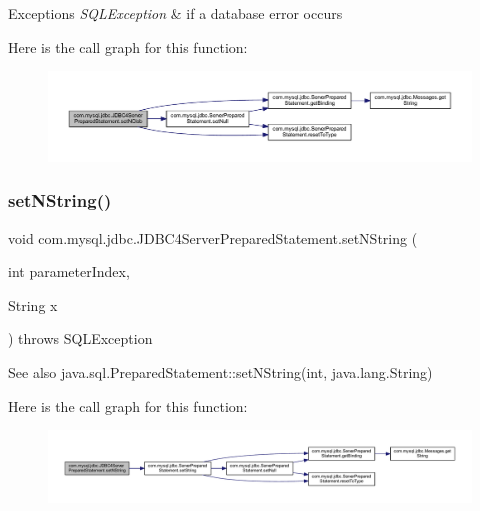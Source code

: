 \begin{DoxyExceptions}{Exceptions}
{\em S\+Q\+L\+Exception} & if a database error occurs \\
\hline
\end{DoxyExceptions}
Here is the call graph for this function\+:
\nopagebreak
\begin{figure}[H]
\begin{center}
\leavevmode
\includegraphics[width=350pt]{classcom_1_1mysql_1_1jdbc_1_1_j_d_b_c4_server_prepared_statement_ac23ffa64369e7e5739c4f6c4ad1d0603_cgraph}
\end{center}
\end{figure}
\mbox{\label{classcom_1_1mysql_1_1jdbc_1_1_j_d_b_c4_server_prepared_statement_ae84254367761392e3c048bb7101d1074}} 
\subsubsection{\texorpdfstring{set\+N\+String()}{setNString()}}
{\footnotesize\ttfamily void com.\+mysql.\+jdbc.\+J\+D\+B\+C4\+Server\+Prepared\+Statement.\+set\+N\+String (\begin{DoxyParamCaption}\item[{int}]{parameter\+Index,  }\item[{String}]{x }\end{DoxyParamCaption}) throws S\+Q\+L\+Exception}

\begin{DoxySeeAlso}{See also}
java.\+sql.\+Prepared\+Statement\+::set\+N\+String(int, java.\+lang.\+String) 
\end{DoxySeeAlso}
Here is the call graph for this function\+:
\nopagebreak
\begin{figure}[H]
\begin{center}
\leavevmode
\includegraphics[width=350pt]{classcom_1_1mysql_1_1jdbc_1_1_j_d_b_c4_server_prepared_statement_ae84254367761392e3c048bb7101d1074_cgraph}
\end{center}
\end{figure}


